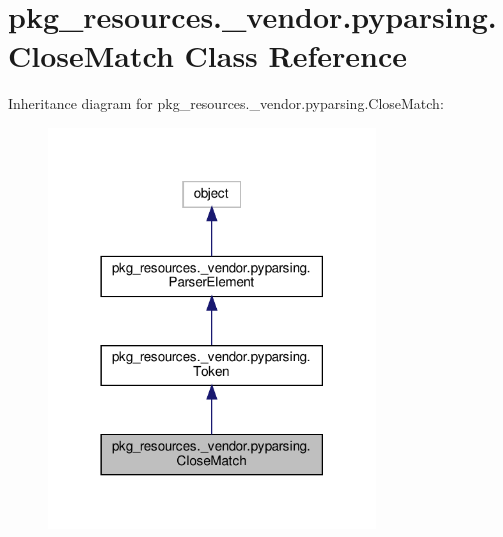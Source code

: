 \hypertarget{classpkg__resources_1_1__vendor_1_1pyparsing_1_1CloseMatch}{}\section{pkg\+\_\+resources.\+\_\+vendor.\+pyparsing.\+Close\+Match Class Reference}
\label{classpkg__resources_1_1__vendor_1_1pyparsing_1_1CloseMatch}


Inheritance diagram for pkg\+\_\+resources.\+\_\+vendor.\+pyparsing.\+Close\+Match\+:
\nopagebreak
\begin{figure}[H]
\begin{center}
\leavevmode
\includegraphics[width=246pt]{classpkg__resources_1_1__vendor_1_1pyparsing_1_1CloseMatch__inherit__graph}
\end{center}
\end{figure}


